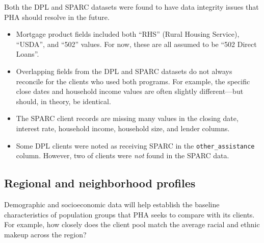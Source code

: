 \documentclass[
  letterpaper,
  DIV=11,
  numbers=noendperiod]{scrartcl}
\begin{document}
\begin{tcolorbox}[enhanced jigsaw, coltitle=black, titlerule=0mm, breakable, colbacktitle=quarto-callout-warning-color!10!white, opacityback=0, leftrule=.75mm, opacitybacktitle=0.6, rightrule=.15mm, title=\textcolor{quarto-callout-warning-color}{\faExclamationTriangle}\hspace{0.5em}{Data integrity issues}, arc=.35mm, colback=white, bottomtitle=1mm, toptitle=1mm, colframe=quarto-callout-warning-color-frame, bottomrule=.15mm, toprule=.15mm, left=2mm]

Both the DPL and SPARC datasets were found to have data integrity issues
that PHA should resolve in the future.

\begin{itemize}
\item
  Mortgage product fields included both ``RHS'' (Rural Housing Service),
  ``USDA'', and ``502'' values. For now, these are all assumed to be
  ``502 Direct Loans''.
\item
  Overlapping fields from the DPL and SPARC datasets do not always
  reconcile for the clients who used both programs. For example, the
  specific close dates and household income values are often slightly
  different---but should, in theory, be identical.
\item
  The SPARC client records are missing many values in the closing date,
  interest rate, household income, household size, and lender columns.
\item
  Some DPL clients were noted as receiving SPARC in the
  \texttt{other\_assistance} column. However, two of clients were
  \emph{not} found in the SPARC data.
\end{itemize}

\end{tcolorbox}

\hypertarget{regional-and-neighborhood-profiles}{%
\subsection{Regional and neighborhood
profiles}\label{regional-and-neighborhood-profiles}}

\begin{tcolorbox}[enhanced jigsaw, coltitle=black, titlerule=0mm, breakable, colbacktitle=quarto-callout-tip-color!10!white, opacityback=0, leftrule=.75mm, opacitybacktitle=0.6, rightrule=.15mm, title=\textcolor{quarto-callout-tip-color}{\faLightbulb}\hspace{0.5em}{Why this is needed}, arc=.35mm, colback=white, bottomtitle=1mm, toptitle=1mm, colframe=quarto-callout-tip-color-frame, bottomrule=.15mm, toprule=.15mm, left=2mm]

Demographic and socioeconomic data will help establish the baseline
characteristics of population groups that PHA seeks to compare with its
clients. For example, how closely does the client pool match the average
racial and ethnic makeup across the region?

\end{tcolorbox}
\end{document}
